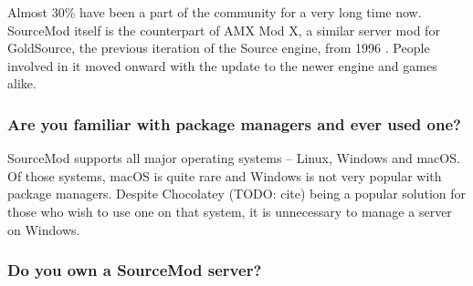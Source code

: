\begin{figure}[H]
  \centering
\end{figure}

Almost 30\% have been a part of the community for a very long time now.
SourceMod itself is the counterpart of AMX Mod X, a similar server mod for GoldSource, the previous iteration of the Source engine, from 1996 \cite{valve-goldsrc}.
People involved in it moved onward with the update to the newer engine and games alike.

\subsubsection{Are you familiar with package managers and ever used one?}

\begin{figure}[H]
  \centering
\end{figure}

SourceMod supports all major operating systems -- Linux, Windows and macOS\@.
Of those systems, macOS is quite rare and Windows is not very popular with package managers.
Despite Chocolatey (TODO: cite) being a popular solution for those who wish to use one on that system, it is unnecessary to manage a server on Windows.

\subsubsection{Do you own a SourceMod server?}

